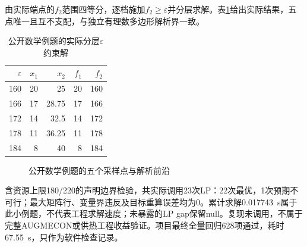由实际端点的$f_2$范围四等分，逐档施加$f_2\geq\varepsilon$并分层求解。表\ref{tab:published-epsilon}给出实际结果，五点唯一且互不支配，与独立有理数多边形解析界一致。
\begin{table}[H]
\centering
\caption{公开数学例题的实际分层$\varepsilon$约束解}
\label{tab:published-epsilon}
\begin{tabular}{rrrrr}
\toprule
$\varepsilon$ & $x_1$ & $x_2$ & $f_1$ & $f_2$\\
\midrule
160 & 20 & 25 & 20 & 160\\
166 & 17 & 28.75 & 17 & 166\\
172 & 14 & 32.5 & 14 & 172\\
178 & 11 & 36.25 & 11 & 178\\
184 & 8 & 40 & 8 & 184\\
\bottomrule
\end{tabular}
\end{table}

\begin{figure}[H]
\centering
{}
\caption{公开数学例题的五个采样点与解析前沿}
\end{figure}

含资源上限180/220的声明边界检验，共实际调用23次LP：22次最优，1次预期不可行；最大矩阵行、变量界违反及目标重算误差均为0。累计求解0.017743~s属于此小例题，不代表工程求解速度；未暴露的LP gap保留null。复现未调用，不属于完整AUGMECON或供热工程收益验证。项目最终全量回归628项通过，耗时67.55~s，只作为软件检查记录。
